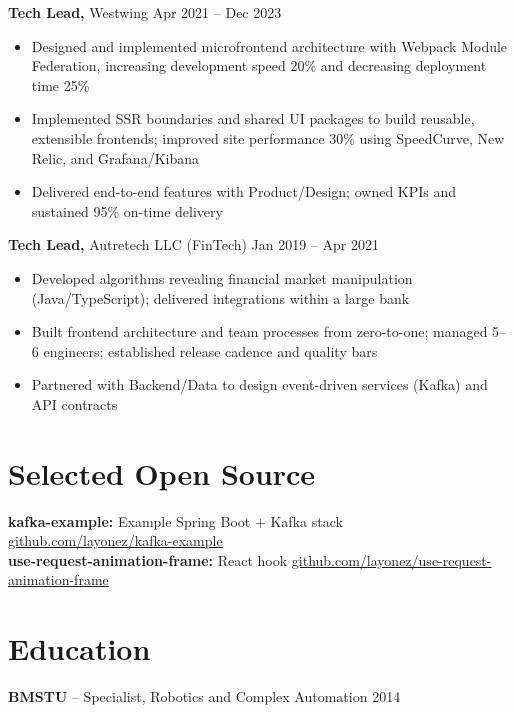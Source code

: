 \documentclass[11pt]{article}
\begin{document}
\textbf{Tech Lead,} Westwing \hfill Apr 2021 -- Dec 2023 \\
\vspace{-9pt}
\begin{itemize}
  \item Designed and implemented microfrontend architecture with Webpack Module Federation, increasing development speed 20\% and decreasing deployment time 25\%
  \item Implemented SSR boundaries and shared UI packages to build reusable, extensible frontends; improved site performance 30\% using SpeedCurve, New Relic, and Grafana/Kibana
  \item Delivered end-to-end features with Product/Design; owned KPIs and sustained 95\% on-time delivery
\end{itemize}

\textbf{Tech Lead,} Autretech LLC (FinTech) \hfill Jan 2019 -- Apr 2021 \\
\vspace{-9pt}
\begin{itemize}
  \item Developed algorithms revealing financial market manipulation (Java/TypeScript); delivered integrations within a large bank
  \item Built frontend architecture and team processes from zero-to-one; managed 5--6 engineers; established release cadence and quality bars
  \item Partnered with Backend/Data to design event-driven services (Kafka) and API contracts
\end{itemize}

\vspace{-6.5pt}

\section*{Selected Open Source}
\textbf{kafka-example:} Example Spring Boot + Kafka stack \hfill \href{https://github.com/layonez/kafka-example}{github.com/layonez/kafka-example} \\
\textbf{use-request-animation-frame:} React hook \hfill \href{https://github.com/layonez/use-request-animation-frame}{github.com/layonez/use-request-animation-frame}

\vspace{-6.5pt}

\section*{Education}
\textbf{BMSTU} -- Specialist, Robotics and Complex Automation \hfill 2014
\end{document}
